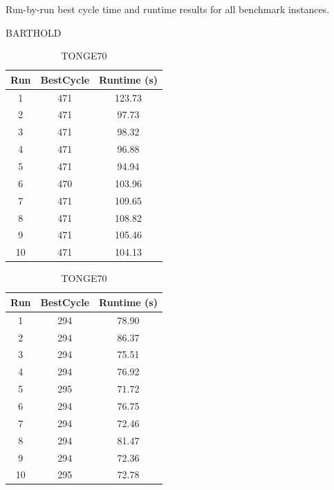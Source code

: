 \documentclass[12pt,a4paper]{article}
\begin{document}
\begin{table}[t]
\centering
\caption{Run-by-run best cycle time and runtime results for all benchmark instances.}
\label{tab:run_by_run_all}
\footnotesize

\begin{subtable}{0.48\textwidth}
\centering
\caption{BARTHOLD}
\begin{tabular}{ccc}
\toprule
Run & BestCycle & Runtime (s) \\
\midrule
1  & 471 & 123.73 \\
2  & 471 & 97.73 \\
3  & 471 & 98.32 \\
4  & 471 & 96.88 \\
5  & 471 & 94.94 \\
6  & 470 & 103.96 \\
7  & 471 & 109.65 \\
8  & 471 & 108.82 \\
9  & 471 & 105.46 \\
10 & 471 & 104.13 \\
\bottomrule
\end{tabular}
\end{subtable}
\hfill
\begin{subtable}{0.48\textwidth}
\centering
\caption{TONGE70}
\begin{tabular}{ccc}
\toprule
Run & BestCycle & Runtime (s) \\
\midrule
1  & 294 & 78.90 \\
2  & 294 & 86.37 \\
3  & 294 & 75.51 \\
4  & 294 & 76.92 \\
5  & 295 & 71.72 \\
6  & 294 & 76.75 \\
7  & 294 & 72.46 \\
8  & 294 & 81.47 \\
9  & 294 & 72.36 \\
10 & 295 & 72.78 \\
\bottomrule
\end{tabular}
\end{subtable}

\vspace{4mm}


\end{table}
\end{document}
